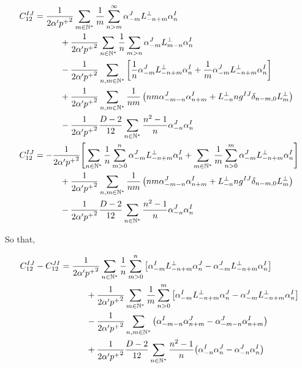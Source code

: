 \begin{align*}
    C_{12}^{IJ}&=\frac{1}{2\alpha'{p^+}^2}\sum\limits_{m\in\mathbb N^\ast}\frac{1}{m}\sum\limits_{n>m}^\infty\alpha^J_{-m}L^\perp_{-n+m}\alpha^I_{n}\\
    &\quad\quad\quad+\frac{1}{2\alpha'{p^+}^2}\sum\limits_{n\in\mathbb N^\ast}\frac{1}{n}\sum\limits_{m>n}\alpha^J_{-m}L^\perp_{m-n}\alpha_n^I\\
    &\quad\quad\quad-\frac{1}{2\alpha'{p^+}^2}\sum\limits_{n,m\in\mathbb N^\ast}\qty[\frac1n\alpha^J_{-m}L^\perp_{-n+m}\alpha_n^I+\frac1m\alpha^J_{-m}L^\perp_{-n+m}\alpha_n^I]\\
    &\quad\quad\quad+\frac{1}{2\alpha'{p^+}^2}\sum\limits_{n,m\in\mathbb N^\ast}\frac{1}{nm}\left(nm\alpha^J_{-m-n}\alpha^I_{n+m}+L^\perp_{-n}ng^{IJ}\delta_{n-m,0}L^\perp_m\right)\\
    &\quad\quad\quad-\frac{1}{2\alpha'{p^+}^2}\frac{D-2}{12}\sum\limits_{n\in\mathbb N^\ast}\frac{n^2-1}{n}\alpha^J_{-n}\alpha_n^I\\
    C_{12}^{IJ}&=-\frac{1}{2\alpha'{p^+}^2}\qty[\sum\limits_{n\in\mathbb N^\ast}\frac1n\sum\limits_{m>0}^n\alpha^J_{-m}L^\perp_{-n+m}\alpha_n^I+\sum\limits_{m\in\mathbb N^\ast}\frac1m\sum\limits_{n>0}^m\alpha^J_{-m}L^\perp_{-n+m}\alpha_n^I]\\
    &\quad\quad\quad+\frac{1}{2\alpha'{p^+}^2}\sum\limits_{n,m\in\mathbb N^\ast}\frac{1}{nm}\left(nm\alpha^J_{-m-n}\alpha^I_{n+m}+L^\perp_{-n}ng^{IJ}\delta_{n-m,0}L^\perp_m\right)\\
    &\quad\quad\quad-\frac{1}{2\alpha'{p^+}^2}\frac{D-2}{12}\sum\limits_{n\in\mathbb N^\ast}\frac{n^2-1}{n}\alpha^J_{-n}\alpha_n^I
\end{align*}

So that,

\begin{align*}
    C_{12}^{IJ}-C_{12}^{JI}&=\frac{1}{2\alpha'{p^+}^2}\sum\limits_{n\in\mathbb N^\ast}\frac1n\sum\limits_{m>0}^n\qty[\alpha^I_{-m}L^\perp_{-n+m}\alpha_n^J-\alpha^J_{-m}L^\perp_{-n+m}\alpha_n^I]\\
    &\quad\quad\quad+\frac{1}{2\alpha'{p^+}^2}\sum\limits_{m\in\mathbb N^\ast}\frac1m\sum\limits_{n>0}^m\qty[\alpha^I_{-m}L^\perp_{-n+m}\alpha_n^J-\alpha^J_{-m}L^\perp_{-n+m}\alpha_n^I]\\
    &\quad\quad\quad-\frac{1}{2\alpha'{p^+}^2}\sum\limits_{n,m\in\mathbb N^\ast}\left(\alpha^I_{-m-n}\alpha^J_{n+m}-\alpha^J_{-m-n}\alpha^I_{n+m}\right)\\
    &\quad\quad\quad+\frac{1}{2\alpha'{p^+}^2}\frac{D-2}{12}\sum\limits_{n\in\mathbb N^\ast}\frac{n^2-1}{n}\qty(\alpha^I_{-n}\alpha_n^J-\alpha^J_{-n}\alpha_n^I)
\end{align*}

